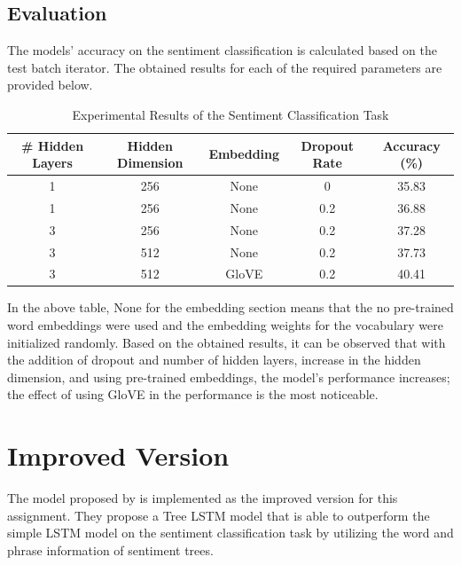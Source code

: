 \documentclass[12pt,a4paper]{article}
\begin{document}
	\vspace{-0.2cm}
	\subsection{Evaluation}
	The models' accuracy on the sentiment classification is calculated based on the test batch iterator. The obtained results for each of the required parameters are provided below.
	
	\begin{table}[H]
		\begin{center}
			\begin{tabular}{|c|c|c|c|c|}
				\hline
				 \# Hidden Layers & Hidden Dimension	& Embedding & Dropout Rate&Accuracy (\%)  \\ \hline
				1 &256 & None &0 &         35.83             \\ \hline
				1 &256 &None &0.2 &       36.88               \\ \hline
				3 &256 &None &0.2 &       37.28               \\ \hline
				3 &512 &None &0.2 &       37.73               \\ \hline
				3 &512 &GloVE &0.2 &      40.41                \\
				\hline             
			\end{tabular}
		\end{center}
	\vspace{-0.5cm}
	\caption{Experimental Results of the Sentiment Classification Task}
	\end{table}

\vspace{-0.3cm}
	\noindent In the above table, None for the embedding section means that the no pre-trained word embeddings were used and the embedding weights for the vocabulary were initialized randomly. Based on the obtained results, it can be observed that with the addition of dropout and number of hidden layers, increase in the hidden dimension, and using pre-trained embeddings, the model's performance increases; the effect of using GloVE in the performance is the most noticeable. 
	
	\vspace{-0.5cm}
	\section{Improved Version}
	\vspace{-0.2cm}
	The model proposed by \cite{TaiSM15} is implemented as the improved version for this assignment. They propose a Tree LSTM model that is able to outperform the simple LSTM model on the sentiment classification task by utilizing the word and phrase information of sentiment trees.
\end{document}
